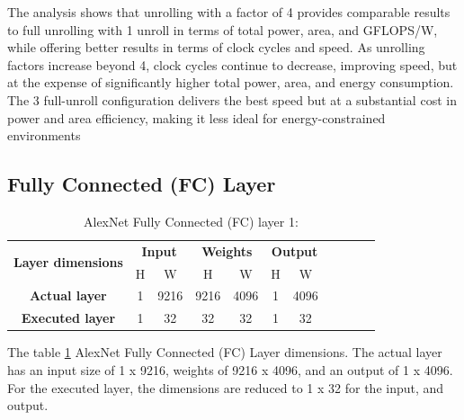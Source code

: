 The analysis shows that unrolling with a factor of 4 provides comparable results to full unrolling with 1 unroll in terms of total power, area, and GFLOPS/W, while offering better results in terms of clock cycles and speed. As unrolling factors increase beyond 4, clock cycles continue to decrease, improving speed, but at the expense of significantly higher total power, area, and energy consumption. The 3 full-unroll configuration delivers the best speed but at a substantial cost in power and area efficiency, making it less ideal for energy-constrained environments

\subsection{Fully Connected (FC) Layer}

\begin{table}[H]
\centering
\caption{AlexNet Fully Connected (FC) layer 1:}
\label{tab:unrollFcDim}
 \begin{tabular}{|c|c|c|c|c|c|c|c|c|c|c|} \hline  
 
 \multirow{2}{*}{\textbf{Layer dimensions}} &  
 \multicolumn{2}{|c|}{\textbf{Input}} &  
 \multicolumn{2}{|c|}{\textbf{Weights}} &  
 \multicolumn{2}{|c|}{\textbf{Output}}\\ \cline{2-7}
 & H &  W &  H &  W & H &  W\\ \hline  
 \textbf{Actual layer} &  1 &  9216 & 9216 & 4096 & 1 & 4096 \\ \hline 
 \textbf{Executed layer} &  1 &  \cellcolor{yellow}32 & \cellcolor{yellow}32 & \cellcolor{yellow}32 & 1 & \cellcolor{yellow}32 \\ \hline 
 \end{tabular}
\end{table}

The table \ref{tab:unrollFcDim}  AlexNet Fully Connected (FC) Layer dimensions. The actual layer has an input size of 1 x 9216, weights of 9216 x 4096, and an output of 1 x 4096. For the executed layer, the dimensions are reduced to 1 x 32 for the input, and output.

